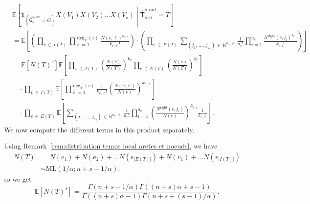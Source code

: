 \documentclass[AHL,Unicode,longabstracts,published]{cedram}
\newcommand{\Ec}[1]{\mathbb{E} \left[#1\right]}
\newcommand{\abs}[1]{\left\lvert#1\right\rvert}
\newcommand{\Ecsq}[2]{\mathbb{E} \left[#1\mathrel{}\middle|\mathrel{}#2\right]}
\newcommand{\ind}[1]{\mathbf{1}_{\left\lbrace #1 \right\rbrace}}
\newcommand{\E}[1]{\ensuremath{\mathbb{E} \left[#1 \right]}}
\newcommand{\ord}{\mathrm{ord}}
\newcommand{\ML}{\mathrm{ML}}
\newcommand{\Rightll}{\mathrm{right}}
\newcommand{\sG}{\mathsf{G}}
\newcommand{\sT}{\mathsf{T}}
\newcommand{\N}{\mathbb{N}}
\begin{document}
\begin{align*}
& \Ecsq{\ind{\widehat{\sG}_{n}^{s,\ord}=G}X(V_1)X(V_2)\dots X(V_s)}{\widehat{\sT}_{s,n}^{s,\ord}=T} \\
& = \E{\left(\prod_{v\,\in\,I(T)}\prod_{\ell=1}^{\deg_T(v)}\frac{N(v,\ell)^{k_{v,\ell}}}{k_{v,\ell}!}\right)
\cdot\left(\prod_{e\,\in\,E(T)}\sum_{\left(j_1,\,\dots,\,j_{a_e}\right)\,\in\,\N^{a_e,\neq}} \frac{1}{a_e!} \prod_{i=1}^{a_e} \frac{N^{\Rightll}\left(e,j_{i}\right)^{k_{e,i}}} {k_{e,i}!} \right)} \\
& = \E{N(T)^s} \E{\prod_{v\,\in\,I(T)} \left(\frac{N(v)}{N(T)}\right)^{k_v} \prod_{e\,\in\, E(T)} \left(\frac{N(e)}{N(T)} \right)^{k_e} }\\
&\quad\cdot\prod_{v\,\in\,I(T)} \E{\prod_{\ell=1}^{\deg_T(v)} \frac{1}{k_{v,\ell}!} \left(\frac{N(v,\ell)}{N(v)} \right)^{k_{v, \ell}} } \\
&\quad\cdot\prod_{e\,\in\,E(T)} \E{ \sum_{\left(j_1,\,\ldots,\,j_{a_e}\right)\,\in\,\N^{a_e, \neq}} \frac{1}{a_e!}\prod_{i=1}^{a_e} \left(\frac{N^{\Rightll}(e, j_i)}{N(e)}\right)^{k_{e,i}} \frac{1}{k_{e,i}!}}\,.
\end{align*}
We now compute the different terms in this product separately.

Using Remark~\ref{rem:distribution temps local aretes et noeuds}, we have
\begin{align*}
N(T)
&=N(e_1)+N(e_2)+\dots N\left(e_{\abs{E(T)}}\right)+N(v_1)+\dots N\left(v_{\abs{I(T)}}\right)\\
&\sim \ML\left(1/\alpha;n+s-1/\alpha \right),
\end{align*}
so we get
\[
\Ec{N(T)^s}= \frac{\Gamma(n+s-1/\alpha)\Gamma((n+s)\alpha +s-1)}{\Gamma((n+s)\alpha -1)\Gamma(n+s+(s-1)/\alpha)}.
\]
\end{document}
